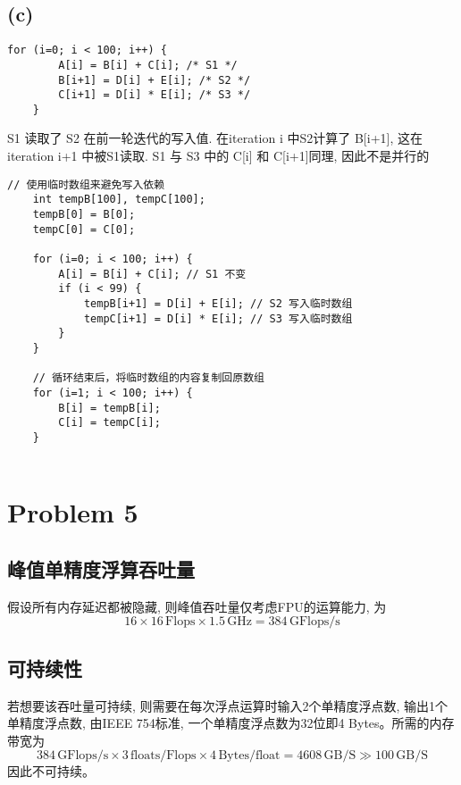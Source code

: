 \documentclass{article}
\begin{document}
\subsection*{(c)}
\begin{lstlisting}[frame=single]
    for (i=0; i < 100; i++) {
        A[i] = B[i] + C[i]; /* S1 */
        B[i+1] = D[i] + E[i]; /* S2 */
        C[i+1] = D[i] * E[i]; /* S3 */
    }
\end{lstlisting}
\noindent
S1 读取了 S2 在前一轮迭代的写入值. 在iteration i 中S2计算了 B[i+1], 这在 iteration i+1 中被S1读取.
S1 与 S3 中的 C[i] 和 C[i+1]同理, 因此不是并行的
\begin{lstlisting}[frame=single]
    // 使用临时数组来避免写入依赖
    int tempB[100], tempC[100];
    tempB[0] = B[0];
    tempC[0] = C[0];
    
    for (i=0; i < 100; i++) {
        A[i] = B[i] + C[i]; // S1 不变
        if (i < 99) {
            tempB[i+1] = D[i] + E[i]; // S2 写入临时数组
            tempC[i+1] = D[i] * E[i]; // S3 写入临时数组
        }
    }
    
    // 循环结束后，将临时数组的内容复制回原数组
    for (i=1; i < 100; i++) {
        B[i] = tempB[i];
        C[i] = tempC[i];
    }
    
\end{lstlisting}

\section*{Problem 5}
\subsection*{峰值单精度浮算吞吐量}
\noindent
假设所有内存延迟都被隐藏, 则峰值吞吐量仅考虑FPU的运算能力, 为
\[ 16 \times 16\,\text{Flops}\times1.5\,\text{GHz} = 384\,\text{GFlops/s}\]
\subsection*{可持续性}
若想要该吞吐量可持续, 则需要在每次浮点运算时输入2个单精度浮点数, 输出1个单精度浮点数, 由IEEE 754标准, 一个单精度浮点数为32位即4 Bytes。所需的内存带宽为
\[384\,\text{GFlops/s} \times 3\,\text{floats/Flops} \times 4\,\text{Bytes/float} = 4608 \,\text{GB/S} \gg 100\,\text{GB/S}\]
因此不可持续。
\end{document}
